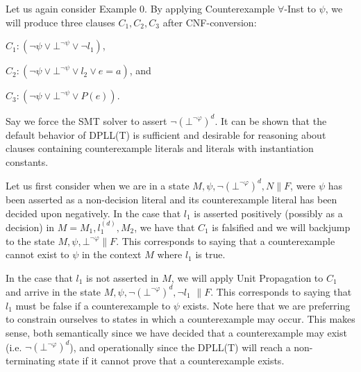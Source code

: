 \documentclass{llncs}
\begin{document}
Let us again consider Example 0.
By applying Counterexample $\forall$-Inst to $\psi$, we will produce three clauses $C_1, C_2, C_3$ after CNF-conversion:

$C_1 : ( \neg \psi \vee \bot^{\neg \psi} \vee \neg l_1 )$,

$C_2 : ( \neg \psi \vee \bot^{\neg \psi} \vee l_2 \vee e = a )$, and

$C_3 : ( \neg \psi \vee \bot^{\neg \psi} \vee P( e ) )$.

Say we force the SMT solver to assert $\neg( \bot^{\neg \varphi} )^d$.
It can be shown that the default behavior of DPLL(T) is sufficient and desirable for reasoning about clauses containing counterexample literals and literals with instantiation constants.

Let us first consider when we are in a state $M, \psi, \neg( \bot^{\neg \varphi} )^d, N \parallel F$, were $\psi$ has been asserted as a non-decision literal and its counterexample literal has been decided upon negatively.
In the case that $l_1$ is asserted positively (possibly as a decision) in $M = M_1, l^{(d)}_1, M_2$, we have that $C_1$ is falsified and we will backjump to the state $M, \psi, \bot^{\neg \varphi} \parallel F$.
This corresponds to saying that a counterexample cannot exist to $\psi$ in the context $M$ where $l_1$ is true.

In the case that $l_1$ is not asserted in $M$, we will apply Unit Propagation to $C_1$ and arrive in the state $M, \psi, \neg( \bot^{\neg \varphi} )^d, \neg l_1$ $\parallel F$.
This corresponds to saying that $l_1$ must be false if a counterexample to $\psi$ exists.
Note here that we are preferring to constrain ourselves to states in which a counterexample may occur.
This makes sense, both semantically since we have decided that a counterexample may exist (i.e. $\neg( \bot^{\neg \varphi} )^d$), and operationally since the DPLL(T) will reach a non-terminating state if it cannot prove that a counterexample exists.

\end{document}
